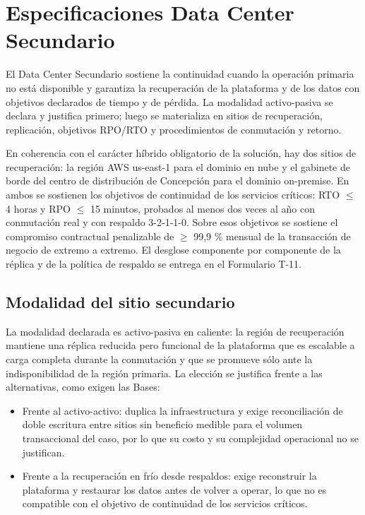 %

\section{Especificaciones Data Center Secundario}
\label{sec:e-especificaciones-del-sitio-secundario-y-}

El Data Center Secundario sostiene la continuidad cuando la operación primaria no está disponible y garantiza la recuperación de la plataforma y de los datos con objetivos declarados de tiempo y de pérdida. La modalidad activo-pasiva se declara y justifica primero; luego se materializa en sitios de recuperación, replicación, objetivos RPO/RTO y procedimientos de conmutación y retorno.

En coherencia con el carácter híbrido obligatorio de la solución, hay dos sitios de recuperación: la región AWS us-east-1 para el dominio en nube y el gabinete de borde del centro de distribución de Concepción para el dominio on-premise. En ambos se sostienen los objetivos de continuidad de los servicios críticos: RTO $\leq$ 4 horas y RPO $\leq$ 15 minutos, probados al menos dos veces al año con conmutación real y con respaldo 3-2-1-1-0. Sobre esos objetivos se sostiene el compromiso contractual penalizable de $\geq$ 99,9 \% mensual de la transacción de negocio de extremo a extremo. El desglose componente por componente de la réplica y de la política de respaldo se entrega en el Formulario T-11.

\subsection{Modalidad del sitio secundario}

La modalidad declarada es activo-pasiva en caliente: la región de recuperación mantiene una réplica reducida pero funcional de la plataforma que es escalable a carga completa durante la conmutación y que se promueve sólo ante la indisponibilidad de la región primaria. La elección se justifica frente a las alternativas, como exigen las Bases:

\begin{itemize}
  \item Frente al activo-activo: duplica la infraestructura y exige reconciliación de doble escritura entre sitios sin beneficio medible para el volumen transaccional del caso, por lo que su costo y su complejidad operacional no se justifican.
  \item Frente a la recuperación en frío desde respaldos: exige reconstruir la plataforma y restaurar los datos antes de volver a operar, lo que no es compatible con el objetivo de continuidad de los servicios críticos.
\end{itemize}

